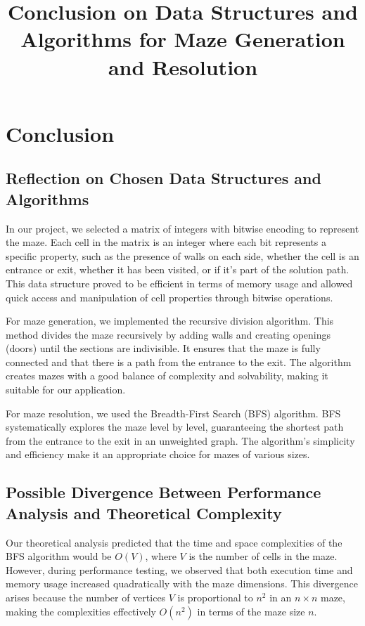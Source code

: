 \documentclass{article}
\begin{document}
\title{Conclusion on Data Structures and Algorithms for Maze Generation and Resolution}
\author{}
\date{}
\maketitle

\section*{Conclusion}

\subsection*{Reflection on Chosen Data Structures and Algorithms}

In our project, we selected a matrix of integers with bitwise encoding to represent the maze. Each cell in the matrix is an integer where each bit represents a specific property, such as the presence of walls on each side, whether the cell is an entrance or exit, whether it has been visited, or if it's part of the solution path. This data structure proved to be efficient in terms of memory usage and allowed quick access and manipulation of cell properties through bitwise operations.

For maze generation, we implemented the recursive division algorithm. This method divides the maze recursively by adding walls and creating openings (doors) until the sections are indivisible. It ensures that the maze is fully connected and that there is a path from the entrance to the exit. The algorithm creates mazes with a good balance of complexity and solvability, making it suitable for our application.

For maze resolution, we used the Breadth-First Search (BFS) algorithm. BFS systematically explores the maze level by level, guaranteeing the shortest path from the entrance to the exit in an unweighted graph. The algorithm's simplicity and efficiency make it an appropriate choice for mazes of various sizes.

\subsection*{Possible Divergence Between Performance Analysis and Theoretical Complexity}

Our theoretical analysis predicted that the time and space complexities of the BFS algorithm would be \(O(V)\), where \(V\) is the number of cells in the maze. However, during performance testing, we observed that both execution time and memory usage increased quadratically with the maze dimensions. This divergence arises because the number of vertices \(V\) is proportional to \(n^2\) in an \(n \times n\) maze, making the complexities effectively \(O(n^2)\) in terms of the maze size \(n\).
\end{document}
